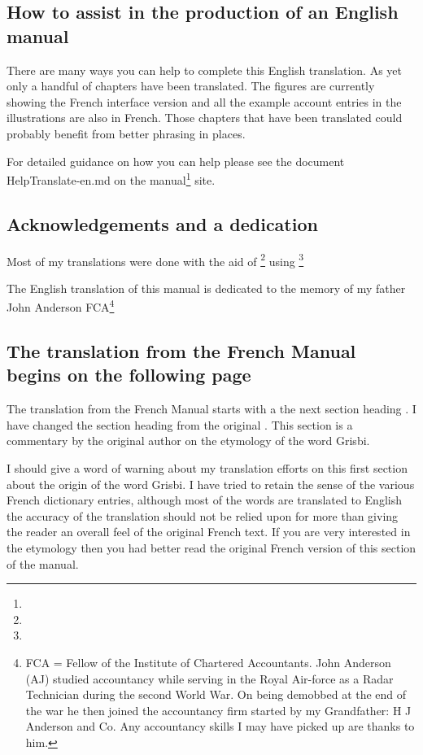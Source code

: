 \subsection*{How to assist in the production of an English manual}

There are many ways you can help to complete this English translation.  As yet only a handful of chapters have been translated.  The figures are currently showing the French interface version and all the example account entries in the illustrations are also in French.  Those chapters that have been translated could probably benefit from better phrasing in places.

For detailed guidance on how you can help please see the document HelpTranslate-en.md on the manual\footnote{\urlGitDoc{}} site.

\subsection*{Acknowledgements and a dedication}
Most of my translations were done with the aid of \footnote{\urlGtrans{}}
using \footnote{\urlGtransShell{}}

The English translation of this manual is dedicated to the memory of my father John Anderson FCA\footnote{FCA = Fellow of the Institute of Chartered Accountants.  John Anderson (AJ)  studied accountancy while serving in the Royal Air-force as a Radar Technician during the second World War.  On being demobbed at the end of the war he then joined the accountancy firm started by my Grandfather: H J Anderson and Co.  Any accountancy skills I may have picked up are thanks to him.}

\subsection*{The translation from the French Manual begins on the following page}
The translation from the French Manual starts with a the next section heading . I have changed the section heading from the original  .  This section is a commentary by the original author on the etymology of the word Grisbi.

I should give a word of warning about my translation efforts on this first section about the origin of the word Grisbi.  I have tried to retain the sense of the various French dictionary entries,  although most of the words are translated to English the accuracy of the translation should not be relied upon for more than giving the reader an overall feel of the original French text.  If you are very interested in the etymology then you had better read the original French version of this section of the manual.  
\newpage 
